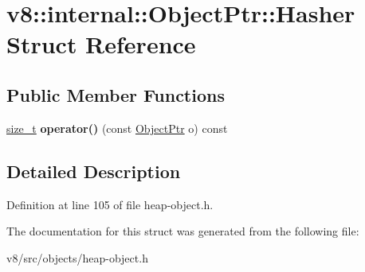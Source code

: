 \hypertarget{structv8_1_1internal_1_1ObjectPtr_1_1Hasher}{}\section{v8\+:\+:internal\+:\+:Object\+Ptr\+:\+:Hasher Struct Reference}
\label{structv8_1_1internal_1_1ObjectPtr_1_1Hasher}
\subsection*{Public Member Functions}
\begin{DoxyCompactItemize}
\item 
\mbox{\label{structv8_1_1internal_1_1ObjectPtr_1_1Hasher_a98764fe601e0434c82d8db8223e78708}} 
\mbox{\hyperlink{classsize__t}{size\+\_\+t}} {\bfseries operator()} (const \mbox{\hyperlink{classv8_1_1internal_1_1ObjectPtr}{Object\+Ptr}} o) const
\end{DoxyCompactItemize}


\subsection{Detailed Description}


Definition at line 105 of file heap-\/object.\+h.



The documentation for this struct was generated from the following file\+:\begin{DoxyCompactItemize}
\item 
v8/src/objects/heap-\/object.\+h\end{DoxyCompactItemize}
